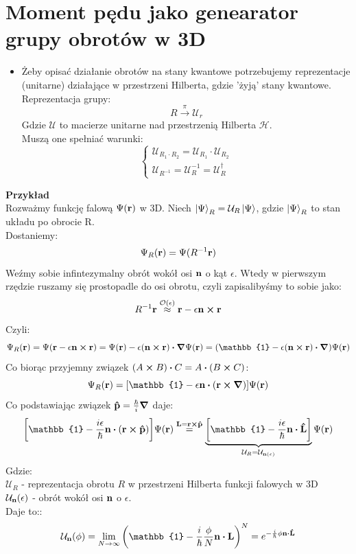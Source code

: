 \documentclass[12pt,a4paper]{report}
\newcommand{\Id}{\mathbb{1}}
\renewcommand{\emph}{\textbf}
\newenvironment{lecture}[1]{\par\medskip
   \noindent\chapter{#1} \rmfamily}{\medskip}
\begin{document}
\begin{lecture}{Moment pędu jako genearator grupy obrotów w 3D}
\begin{itemize}
    \item Żeby opisać działanie obrotów na stany kwantowe potrzebujemy reprezentacje (unitarne) działające w przestrzeni Hilberta, gdzie 'żyją' stany kwantowe.\\
    Reprezentacja grupy:
    \[
        R \stackrel{\pi}{\to} \mathcal{U}_r
    \]
    Gdzie $\mathcal{U}$ to macierze unitarne nad przestrzenią Hilberta $\mathcal{H}$.\\
    Muszą one spełniać warunki:
    \[
        \begin{cases}
            \mathcal{U}_{R_1\cdot R_2} = \mathcal{U}_{R_1} \cdot \mathcal{U}_{R_2}\\
            \mathcal{U}_{R^{-1}} = \mathcal{U}^{-1}_R = \mathcal{U}_R^{\dagger}
        \end{cases}
    \]
\end{itemize}
    \emph{Przykład}\\
    Rozważmy funkcję falową $\Psi(\vb{r})$ w 3D. Niech $\ket{\Psi}_R = \mathcal{U}_R \ket{\Psi}$, gdzie $\ket{\Psi}_R$ to stan układu po obrocie R.\\
    Dostaniemy:
    \[
        \Psi_R(\vb{r}) = \Psi(R^{-1} \vb{r})
    \]
    Weźmy sobie infintezymalny obrót wokół osi $\vb{n}$ o kąt $\epsilon$. Wtedy w pierwszym rzędzie ruszamy się prostopadle do osi obrotu, czyli zapisalibyśmy to sobie jako:
    \[
        R^{-1}\vb{r} \stackrel{\order{\epsilon}}{\approx} \vb{r} - \epsilon \vb{n} \cross \vb{r}
    \]
    Czyli:
    \[
        \Psi_R(\vb{r}) = \Psi(\vb{r} - \epsilon \vb{n} \cross \vb{r}) = \Psi(\vb{r}) - \epsilon(\vb{n}\cross\vb{r}) \vdot \grad{\Psi(\vb{r})} = \qty(\Id - \epsilon(\vb{n}\cp \vb{r})\vdot \grad) \Psi(\vb{r})
    \]
    Co biorąc przyjemny związek $\qty(A\cp B)\vdot C = A\vdot (B\cp C)$:
    \[
        \Psi_R(\vb{r}) = \qty[\Id - \epsilon \vb{n} \vdot \qty(\vb{r} \cross \grad)]\Psi(\vb{r})
    \]
    Co podstawiając związek $\vb{\hat{p}} = \frac{\hbar}{i} \grad$ daje:
    \[
        \qty[\Id - \frac{i\epsilon}{\hbar}\vb{n} \vdot (\vb{r}\cp\vb{\hat{p}})]\Psi(\vb{r}) \stackrel{\vb{L} = \vb{r} \cp \vb{\hat{p}}}{=} \underbrace{\qty[\Id - \frac{i \epsilon}{\hbar}\vb{n} \vdot \vb{\hat{L}}]}_{\mathcal{U}_R = \mathcal{U}_{\vb{n}(\epsilon)}}\Psi(\vb{r})
    \]
    Gdzie:\\
    $\mathcal{U}_R$ - reprezentacja obrotu $R$ w przestrzeni Hilberta funkcji falowych w 3D\\
    $\mathcal{U}_{\vb{n}}(\epsilon)$ - obrót wokół osi $\vb{n}$ o $\epsilon$.\\
    Daje to::
    \[
        \mathcal{U}_{\vb{n}}(\phi) = \lim_{N\to\infty}\qty(\Id - \frac{i}{\hbar}\frac{\phi}{N} \vb{n}\vdot \vb{L})^N = e^{-\frac{i}{\hbar} \phi \vb{n} \vdot \vb{\hat{L}}}
\]
\end{lecture}
\end{document}
